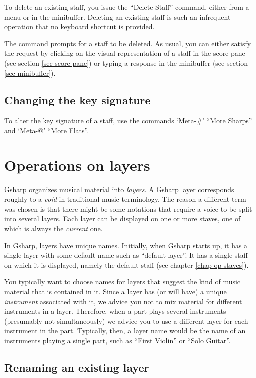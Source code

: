 \documentclass[11pt]{book}
\def\gs{Gsharp}
\def\kbd#1{`#1'}
\def\command#1{``#1''}
\begin{document}
To delete an existing staff, you issue the \command{Delete Staff}
command, either from a menu or in the minibuffer.  Deleting an
existing staff is such an infrequent operation that no keyboard
shortcut is provided. 

The command prompts for a staff to be deleted.  As usual, you can
either satisfy the request by clicking on the visual representation of
a staff in the score pane (see section \ref{sec-score-pane}) or typing
a response in the minibuffer (see section \ref{sec-minibuffer}). 

\section{Changing the key signature}

To alter the key signature of a staff, use the commands \kbd{Meta-\#}
\command{More Sharps} and \kbd{Meta-@} \command{More Flats}. 

\chapter{Operations on layers}

{\gs} organizes musical material into \emph{layers}.  A
{\gs} layer corresponds roughly to a \emph{void} in
traditional music terminology.  The reason a different term was chosen
is that there might be some notations that require a voice to be split
into several layers.  Each layer can be displayed on one or more
staves, one of which is always the \emph{current}
one. 

In {\gs}, layers have unique names.  Initially, when {\gs} starts up,
it has a single layer with some default name such as ``default
layer''. It has a single staff on which it is displayed, namely the
default staff (see chapter \ref{chap-op-staves}).  

You typically want to choose names for layers that suggest the kind of
music material that is contained in it.  Since a layer has (or will
have) a unique \emph{instrument} associated with it,
we advice you not to mix material for different instruments in a
layer.  Therefore, when a part plays several instruments (presumably
not simultaneously) we advice you to use a different layer for each
instrument in the part.  Typically, then, a layer name would be the
name of an instruments playing a single part, such as ``First Violin''
or ``Solo Guitar''.  

\section{Renaming an existing layer}
\end{document}
